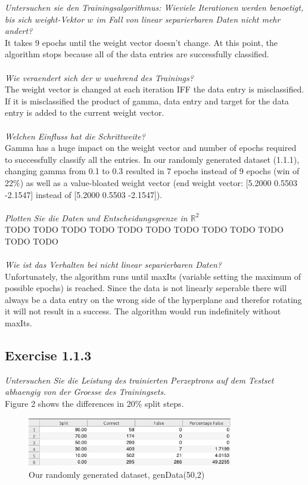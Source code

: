 \documentclass[12pt]{article}
\def\x#1#2{$\mathbb{#1}^#2$}
\def\n#1{\x#1}
\begin{document}
\textit{Untersuchen sie den Trainingsalgorithmus: Wieviele Iterationen werden benoetigt, bis sich weight-Vektor $w$ im Fall von linear separierbaren Daten nicht mehr andert?}
\\
It takes 9 epochs until the weight vector doesn't change. At this point, the algorithm stops because all of the data entries are successfully classified.
\\
\\
\textit{Wie veraendert sich der w waehrend des Trainings?}
\\
The weight vector is changed at each iteration IFF the data entry is misclassified. If it is misclassified the product of gamma, data entry and target for the data entry is added to the current weight vector.
\\
\\

\textit{Welchen Einfluss hat die Schrittweite?}
\\
Gamma has a huge impact on the weight vector and number of epochs required to successfully classify all the entries. In our randomly generated dataset (1.1.1), changing gamma from 0.1 to 0.3 resulted in 7 epochs instead of 9 epochs (win of 22\%) as well as a value-bloated weight vector (end weight vector:  [5.2000 0.5503 -2.1547] instead of [5.2000 0.5503 -2.1547]).
\\
\\


\textit{Plotten Sie die Daten und Entscheidungsgrenze in \n{R2}}
\\
TODO TODO TODO TODO TODO TODO TODO TODO TODO TODO TODO TODO
\\
\\

\textit{Wie ist das Verhalten bei nicht linear separierbaren Daten?}
\\
Unfortunately, the algorithm runs until maxIts (variable setting the maximum of possible epochs) is reached. Since the data is not linearly seperable there will always be a data entry on the wrong side of the hyperplane and therefor rotating it will not result in a success. The algorithm would run indefinitely without maxIts. 

\subsection{Exercise 1.1.3}
\textit{Untersuchen Sie die Leistung des trainierten Perzeptrons auf dem Testset abhaengig von der Groesse des Trainingsets.}
\\
Figure 2 shows the differences in 20\% split steps.
\\
\begin{figure}[htp]
	\centering
	\includegraphics[width=0.8\textwidth]{ab1_1_3}
	\caption{Our randomly generated dataset, genData(50,2)}
\end{figure}
\end{document}
